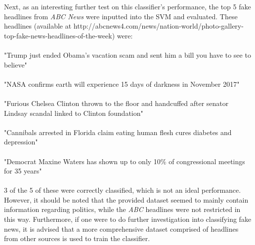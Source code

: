 \documentclass{article}
\begin{document}
Next, as an interesting further test on this classifier's performance, the top 5 fake headlines from \textit{ABC News} were inputted into the SVM and evaluated. These headlines (available at http://abcnews4.com/news/nation-world/photo-gallery-top-fake-news-headlines-of-the-week) were:\\\\
"Trump just ended Obama's vacation scam and sent him a bill you have to see to believe"\\\\
"NASA confirms earth will experience 15 days of darkness in November 2017"\\\\
"Furious Chelsea Clinton thrown to the floor and handcuffed after senator Lindsay scandal linked to Clinton foundation"\\\\
"Cannibals arrested in Florida claim eating human flesh cures diabetes and depression"\\\\
"Democrat Maxine Waters has shown up to only 10\% of congressional meetings for 35 years"\\\\
3 of the 5 of these were correctly classified, which is not an ideal performance. However, it should be noted that the provided dataset seemed to mainly contain information regarding politics, while the \textit{ABC} headlines were not restricted in this way. Furthermore, if one were to do further investigation into classifying fake news, it is advised that a more comprehensive dataset comprised of headlines from other sources is used to train the classifier.\\
\end{document}
